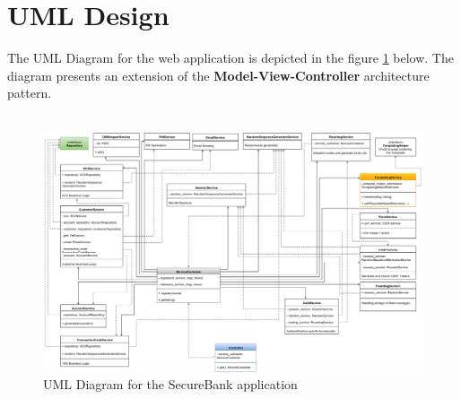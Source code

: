 \section{UML Design} \label{section_classes}

The UML Diagram for the web application is depicted in the figure \ref{fig:webapp_class_diagram} below.
The diagram presents an extension of the \textbf{Model-View-Controller} architecture pattern. \\ \\

\vspace{20mm}

\begin{figure}[ht]
	\centering
	\includegraphics[width=0.9\linewidth]{figures/webapp_class_diagram.png}
	\caption{UML Diagram for the SecureBank application}
	\label{fig:webapp_class_diagram}
\end{figure}

\clearpage

